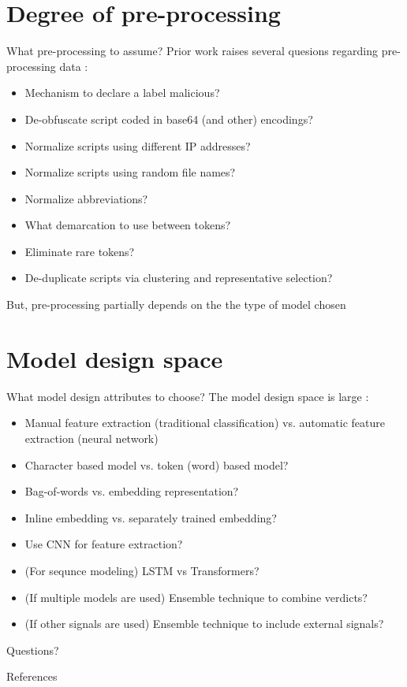 \documentclass[10pt]{beamer}
\begin{document}
\section{Degree of pre-processing}

\begin{frame}[fragile]{What pre-processing to assume?}
	Prior work raises several quesions regarding pre-processing data \cite{powershell2018,amsi2019,feye2018}:
	\begin{itemize}
		\item Mechanism to declare a label malicious?
		\item De-obfuscate script coded in base64 (and other) encodings?
		\item Normalize scripts using different IP addresses?
		\item Normalize scripts using random file names?
		\item Normalize abbreviations?
		\item What demarcation to use between tokens?
		\item Eliminate rare tokens?
		\item De-duplicate scripts via clustering and representative selection?
	\end{itemize}
	But, pre-processing partially depends on the the type of model chosen
\end{frame}

\section{Model design space}

\begin{frame}[fragile]{What model design attributes to choose?}
	The model design space is large \cite{msft2017,powershell2018,amsi2019,feye2018,feye2018-2,textcnn2016,textcnn2019}:
	\begin{itemize}
		\item Manual feature extraction (traditional classification) vs. automatic feature extraction (neural network)
		\item Character based model vs. token (word) based model?
		\item Bag-of-words vs. embedding representation?
		\item Inline embedding vs. separately trained embedding?
		\item Use CNN for feature extraction?
		\item (For sequnce modeling) LSTM vs Transformers? 
		\item (If multiple models are used) Ensemble technique to combine verdicts?
		\item (If other signals are used) Ensemble technique to include external signals?
	\end{itemize}
\end{frame}
\begin{frame}[standout]
  Questions?
\end{frame}

\appendix

\begin{frame}[allowframebreaks]{References}

  
  

\end{frame}
\end{document}
